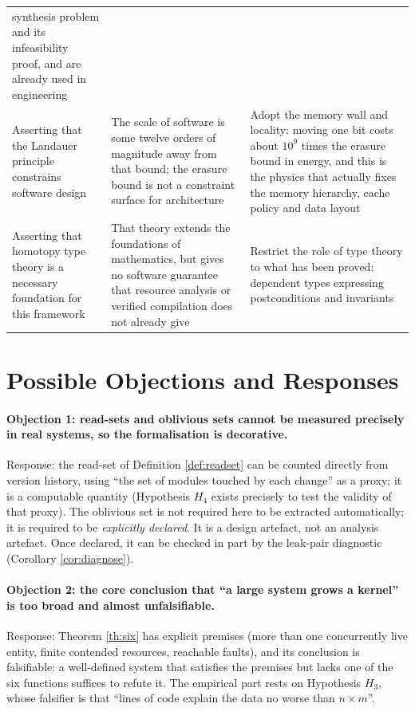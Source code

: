 \begin{longtable}{L{3.4cm}L{5.2cm}L{5.6cm}}
  synthesis problem and its infeasibility proof, and are already used in engineering \\
Asserting that the Landauer principle constrains software design &
  The scale of software is some twelve orders of magnitude away from that bound; the
  erasure bound is not a constraint surface for architecture &
  Adopt the memory wall and locality: moving one bit costs about $10^{9}$ times the erasure
  bound in energy, and this is the physics that actually fixes the memory hierarchy, cache
  policy and data layout \\
Asserting that homotopy type theory is a necessary foundation for this framework &
  That theory extends the foundations of mathematics, but gives no software guarantee that
  resource analysis or verified compilation does not already give &
  Restrict the role of type theory to what has been proved: dependent types expressing
  postconditions and invariants \cite{hott2013} \\
\bottomrule
\end{longtable}

\section{Possible Objections and Responses}

\paragraph{Objection 1: read-sets and oblivious sets cannot be measured precisely in real
systems, so the formalisation is decorative.}
Response: the read-set of Definition \ref{def:readset} can be counted directly from version
history, using ``the set of modules touched by each change'' as a proxy; it is a computable
quantity (Hypothesis $H_4$ exists precisely to test the validity of that proxy). The
oblivious set is not required here to be extracted automatically; it is required to be
\emph{explicitly declared}. It is a design artefact, not an analysis artefact. Once
declared, it can be checked in part by the leak-pair diagnostic (Corollary
\ref{cor:diagnose}).

\paragraph{Objection 2: the core conclusion that ``a large system grows a kernel'' is too
broad and almost unfalsifiable.}
Response: Theorem \ref{th:six} has explicit premises (more than one concurrently live
entity, finite contended resources, reachable faults), and its conclusion is falsifiable: a
well-defined system that satisfies the premises but lacks one of the six functions suffices
to refute it. The empirical part rests on Hypothesis $H_3$, whose falsifier is that ``lines
of code explain the data no worse than $n \times m$''.

